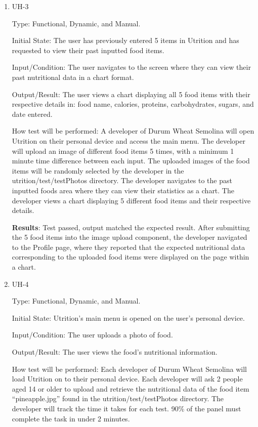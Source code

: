 \documentclass[12pt, titlepage]{article}
\begin{document}
\begin{enumerate}
		\item{UH-3}
		
		Type: Functional, Dynamic, and Manual.
		
		Initial State: The user has previously entered 5 items in Utrition and has requested to view their past inputted food items.
		
		Input/Condition: The user navigates to the screen where they can view their past nutritional data in a chart format.
		
		Output/Result: The user views a chart displaying all 5 food items with their respective details in: food name, calories, proteins, carbohydrates, sugars, and date entered.
		
		How test will be performed: A developer of Durum Wheat Semolina will open Utrition on their personal device and access the main menu. The developer will upload an image of different food items 5 times, with a minimum 1 minute time difference between each input. The uploaded images of the food items will be randomly selected by the developer in the utrition/test/testPhotos directory. The developer navigates to the past inputted foods area where they can view their statistics as a chart. The developer views a chart displaying 5 different food items and their respective details.
		
		\textbf{Results}: Test passed, output matched the expected result. After submitting the 5 food items into the image upload component, the developer navigated to the Profile page, where they reported that the expected nutritional data corresponding to the uploaded food items were displayed on the page within a chart.
		
		\item{UH-4}
		
		Type: Functional, Dynamic, and Manual.
		
		Initial State: Utrition’s main menu is opened on the user’s personal device.
		
		Input/Condition: The user uploads a photo of food.
		
		Output/Result: The user views the food’s nutritional information.
		
		How test will be performed: Each developer of Durum Wheat Semolina will load Utrition on to their personal device. Each developer will ask 2 people aged 14 or older to upload and retrieve the nutritional data of the food item “pineapple.jpg” found in the utrition/test/testPhotos directory. The developer will track the time it takes for each test. 90\% of the panel must complete the task in under 2 minutes.
		

\end{enumerate}
\end{document}
